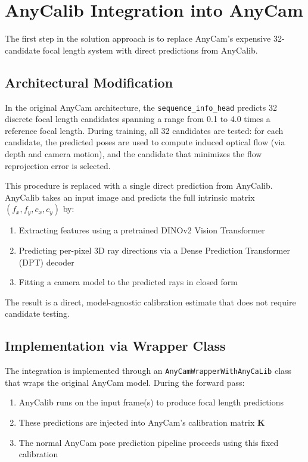 \section{AnyCalib Integration into AnyCam}\label{sec:anycalib-integration}

The first step in the solution approach is to replace AnyCam's expensive 32-candidate focal length system with direct predictions from AnyCalib.

\subsection{Architectural Modification}

In the original AnyCam architecture, the \texttt{sequence\_info\_head} predicts 32 discrete focal length candidates spanning a range from 0.1 to 4.0 times a reference focal length. During training, all 32 candidates are tested: for each candidate, the predicted poses are used to compute induced optical flow (via depth and camera motion), and the candidate that minimizes the flow reprojection error is selected.

This procedure is replaced with a single direct prediction from AnyCalib. AnyCalib takes an input image and predicts the full intrinsic matrix $(f_x, f_y, c_x, c_y)$ by:
\begin{enumerate}
    \item Extracting features using a pretrained DINOv2 Vision Transformer
    \item Predicting per-pixel 3D ray directions via a Dense Prediction Transformer (DPT) decoder
    \item Fitting a camera model to the predicted rays in closed form
\end{enumerate}

The result is a direct, model-agnostic calibration estimate that does not require candidate testing.

\subsection{Implementation via Wrapper Class}

The integration is implemented through an \texttt{AnyCamWrapperWithAnyCaLib} class that wraps the original AnyCam model. During the forward pass:
\begin{enumerate}
    \item AnyCalib runs on the input frame(s) to produce focal length predictions
    \item These predictions are injected into AnyCam's calibration matrix $\mathbf{K}$
    \item The normal AnyCam pose prediction pipeline proceeds using this fixed calibration
\end{enumerate}

